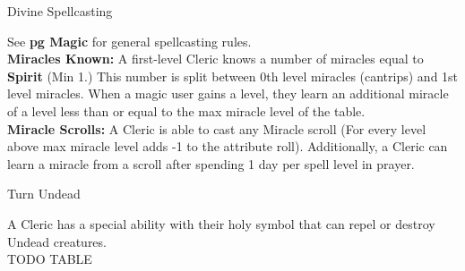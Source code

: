 \documentclass[18pt]{article}
\begin{document}
\begin{multicols}{2}%

\begin{mercHeading}
Divine Spellcasting
\end{mercHeading}

See  \textbf{pg \pageref{section:GenMagicRules} Magic} for general spellcasting rules. \\
\textbf{Miracles Known:} A first-level Cleric knows a number of miracles equal to \textbf{Spirit} (Min 1.) This number is split between 0th level miracles (cantrips) and 1st level miracles. When a magic user gains a level, they learn an additional miracle of a level less than or equal to the max miracle level of the table. \vspace{2pt}\\ 
\textbf{Miracle Scrolls:}
A Cleric is able to cast any Miracle scroll (For every level above max miracle level adds -1 to the attribute roll). Additionally, a Cleric can learn a miracle from a scroll after spending 1 day per spell level in prayer.

\begin{mercHeading}
Turn Undead
\end{mercHeading}
A Cleric has a special ability with their holy symbol that can repel or destroy Undead creatures.\\
TODO TABLE

\end{multicols}
\end{document}
